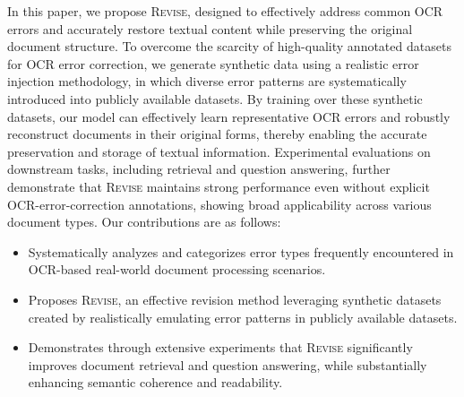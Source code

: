 In this paper, we propose \textsc{Revise}, designed to effectively address common OCR errors and accurately restore textual content while preserving the original document structure. To overcome the scarcity of high-quality annotated datasets for OCR error correction, we generate synthetic data using a realistic error injection methodology, in which diverse error patterns are systematically introduced into publicly available datasets. By training over these synthetic datasets, our model can effectively learn representative OCR errors and robustly reconstruct documents in their original forms, thereby enabling the accurate preservation and storage of textual information. Experimental evaluations on downstream tasks, including retrieval and question answering, further demonstrate that \textsc{Revise} maintains strong performance even without explicit OCR-error-correction annotations, showing broad applicability across various document types. Our contributions are as follows:

\begin{itemize} 
\item Systematically analyzes and categorizes error types frequently encountered in OCR-based real-world document processing scenarios.



\item Proposes \textsc{Revise}, an effective revision method leveraging synthetic datasets created by realistically emulating error patterns in publicly available datasets.

\item Demonstrates through extensive experiments that \textsc{Revise} significantly improves document retrieval and question answering, while substantially enhancing semantic coherence and readability.


\end{itemize}


